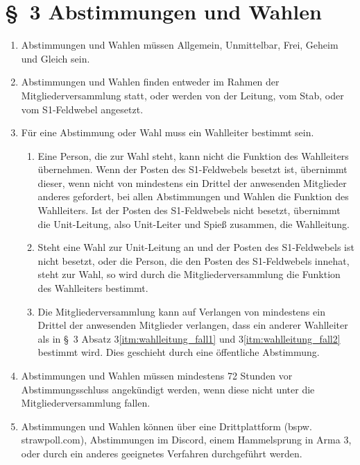 \section*{\S~3 Abstimmungen und Wahlen}
\label{sec:abstimmungen_und_wahlen}

\begin{enumerate}[label=(\arabic*)]
    \item Abstimmungen und Wahlen müssen Allgemein, Unmittelbar, Frei, Geheim und Gleich sein.
    \item Abstimmungen und Wahlen finden entweder im Rahmen der Mitgliederversammlung statt, oder werden von der Leitung, vom Stab, oder vom S1-Feldwebel angesetzt.
    \item Für eine Abstimmung oder Wahl muss ein Wahlleiter bestimmt sein.
    \begin{enumerate}[label=(\Alph*)]
        \item\label{itm:wahlleitung_fall1} Eine Person, die zur Wahl steht, kann nicht die Funktion des Wahlleiters übernehmen. Wenn der Posten des S1-Feldwebels besetzt ist, übernimmt dieser, wenn nicht von mindestens ein Drittel der anwesenden Mitglieder anderes gefordert, bei allen Abstimmungen und Wahlen die Funktion des Wahlleiters. Ist der Posten des S1-Feldwebels nicht besetzt, übernimmt die Unit-Leitung, also Unit-Leiter und Spieß zusammen, die Wahlleitung.
        \item\label{itm:wahlleitung_fall2} Steht eine Wahl zur Unit-Leitung an und der Posten des S1-Feldwebels ist nicht besetzt, oder die Person, die den Posten des S1-Feldwebels innehat, steht zur Wahl, so wird durch die Mitgliederversammlung die Funktion des Wahlleiters bestimmt.
        \item Die Mitgliederversammlung kann auf Verlangen von mindestens ein Drittel der anwesenden Mitglieder verlangen, dass ein anderer Wahlleiter als in \S~3 Absatz 3\ref{itm:wahlleitung_fall1} und 3\ref{itm:wahlleitung_fall2} bestimmt wird. Dies geschieht durch eine öffentliche Abstimmung.
    \end{enumerate}
    \item Abstimmungen und Wahlen müssen mindestens 72 Stunden vor Abstimmungsschluss angekündigt werden, wenn diese nicht unter die Mitgliederversammlung fallen.
    \item Abstimmungen und Wahlen können über eine Drittplattform (bspw. strawpoll.com), Abstimmungen im Discord, einem Hammelsprung in Arma 3, oder durch ein anderes geeignetes Verfahren durchgeführt werden.

\end{enumerate}

